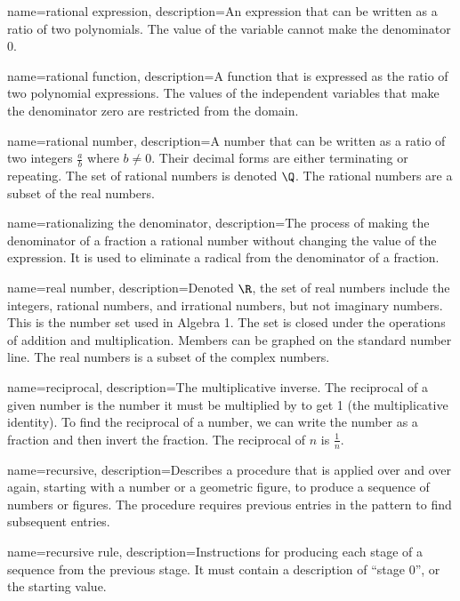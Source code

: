  {
	name=rational expression,
	description={An expression that can be written as a ratio of two polynomials. The value of the variable cannot make the denominator 0.}
}

 {
	name=rational function,
	description={A function that is expressed as the ratio of two polynomial expressions. The values of the independent variables that make the denominator zero are restricted from the domain.}
}

 {
	name=rational number,
	description={A number that can be written as a ratio of two integers $\frac{a}{b}$ where $b \neq 0$. Their decimal forms are either terminating or repeating. The set of rational numbers is denoted $\Q$. The rational numbers are a subset of the real numbers.}
}

 {
	name=rationalizing the denominator,
	description={The process of making the denominator of a fraction a rational number without changing the value of the expression. It is used to eliminate a radical from the denominator of a fraction.}
}

 {
	name=real number,
	description={Denoted $\R$, the set of real numbers include the integers, rational numbers, and irrational numbers, but not imaginary numbers. This is the number set used in Algebra 1. The set is closed under the operations of addition and multiplication. Members can be graphed on the standard number line.  The real numbers is a subset of the complex numbers.}
}

 {
	name=reciprocal,
	description={The multiplicative inverse. The reciprocal of a given number is the number it must be multiplied by to get 1 (the multiplicative identity). To find the reciprocal of a number, we can write the number as a fraction and then invert the fraction. The reciprocal of $n$ is $\frac{1}{n}$.}
}

 {
	name=recursive,
	description={Describes a procedure that is applied over and over again, starting with a number or a geometric figure, to produce a sequence of numbers or figures. The procedure requires previous entries in the pattern to find subsequent entries.}
}

 {
	name=recursive rule,
	description={Instructions for producing each stage of a sequence from the previous stage. It must contain a description of ``stage 0'', or the starting value.}
}

